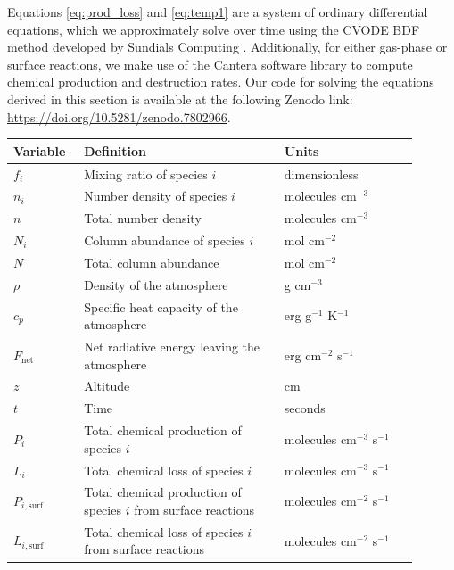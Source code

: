 Equations \eqref{eq:prod_loss} and \eqref{eq:temp1} are a system of ordinary differential equations, which we approximately solve over time using the CVODE BDF method developed by Sundials Computing \citep{Hindmarsh_2005}. Additionally, for either gas-phase or surface reactions, we make use of the Cantera software library \citep{Goodwin_2022} to compute chemical production and destruction rates. Our code for solving the equations derived in this section is available at the following Zenodo link: \url{https://doi.org/10.5281/zenodo.7802966}.

\begin{spacing}{1.0}
\begin{center}
  \begin{tabularx}{\linewidth}{p{0.15\linewidth} | p{0.45\linewidth} | p{0.3\linewidth}} \caption{Variables} \label{tab:5impacts_variables} \\
  \hline \hline
  Variable & Definition & Units \\
  \hline
  $f_{i}$ & Mixing ratio of species $i$ & dimensionless 
  \\
  $n_{i}$ & Number density of species $i$ & molecules cm$^{-3}$ 
  \\
  $n$ & Total number density & molecules cm$^{-3}$ 
  \\
  $N_{i}$ & Column abundance of species $i$ & mol cm$^{-2}$ 
  \\
  $N$ & Total column abundance & mol cm$^{-2}$ 
  \\
  $\rho$ & Density of the atmosphere & g cm$^{-3}$ 
  \\
  $c_p$ & Specific heat capacity of the atmosphere & erg g$^{-1}$ K$^{-1}$
  \\
  $F_\text{net}$ & Net radiative energy leaving the atmosphere & erg cm$^{-2}$ s$^{-1}$
  \\
  $z$ & Altitude & cm 
  \\
  $t$ & Time & seconds 
  \\
  $P_{i}$ & Total chemical production of species $i$ & molecules cm$^{-3}$ s$^{-1}$ 
  \\
  $L_{i}$ & Total chemical loss of species $i$ & molecules cm$^{-3}$ s$^{-1}$ 
  \\
  $P_{i,\text{surf}}$ & Total chemical production of species $i$ from surface reactions & molecules
  cm$^{-2}$ s$^{-1}$ 
  \\
  $L_{i,\text{surf}}$ & Total chemical loss of species $i$ from surface reactions & molecules
  cm$^{-2}$ s$^{-1}$ 
  \\

\end{tabularx}
\end{center}
\end{spacing}
